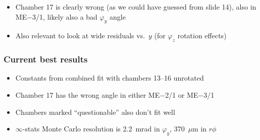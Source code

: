 \documentclass[compress]{beamer}
\begin{document}
\begin{frame}
\vfill
\begin{itemize}
\item Chamber 17 is clearly wrong (as we could have guessed from slide 14), also in ME$-$3/1, likely also a bad $\varphi_y$ angle
\item Also relevant to look at wide residuals vs.\ $y$ (for $\varphi_z$ rotation effects)
\end{itemize}
\end{frame}

\begin{frame}
\frametitle{Current best results}
\small
\begin{itemize}
\item Constants from combined fit with chambers 13--16 unrotated
\item Chamber 17 has the wrong angle in either ME$-$2/1 or ME$-$3/1
\item Chambers marked ``questionable'' also don't fit well
\item $\infty$-stats Monte Carlo resolution is 2.2~mrad in $\varphi_y$, 370~$\mu$m in $r\phi$
\end{itemize}

\begin{center}

\end{center}
\end{frame}
\end{document}
